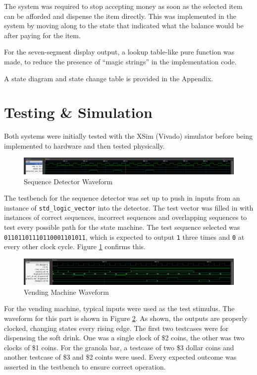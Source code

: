 \documentclass[12pt]{article}
\begin{document}
The system was required to stop accepting money as soon as the selected item can be afforded and dispense the item directly. This was implemented in the system by moving along to the state that indicated what the balance would be after paying for the item.

For the seven-segment display output, a lookup table-like pure function was made, to reduce the presence of ``magic strings'' in the implementation code.

A state diagram and state change table is provided in the Appendix.

\section{Testing \& Simulation}

Both systems were initially tested with the XSim (Vivado) simulator before being implemented to hardware and then tested physically.

\begin{figure}[h]
  \includegraphics[width=\linewidth]{waveform-sequence.png}
  \caption{Sequence Detector Waveform}
  \label{fig:waveform-sequence}
\end{figure}

The testbench for the sequence detector was set up to push in inputs from an instance of \verb|std_logic_vector| into the detector. The test vector was filled in with instances of correct sequences, incorrect sequences and overlapping sequences to test every possible path for the state machine.
The test sequence selected was \verb|01101101110110001101011|, which is expected to output \verb|1| three times and \verb|0| at every other clock cycle. Figure \ref{fig:waveform-sequence} confirms this.

\begin{figure}[h]
  \includegraphics[width=\linewidth]{waveform-vending.png}
  \caption{Vending Machine Waveform}
  \label{fig:waveform-vending}
\end{figure}

For the vending machine, typical inputs were used as the test stimulus. The waveform for this part is shown in Figure \ref{fig:waveform-vending}. As shown, the outputs are properly clocked, changing states every rising edge. The first two testcases were for dispensing the soft drink. One was a single clock of \$2 coins, the other was two clocks of \$1 coins. For the granola bar, a testcase of two \$3 dollar coins and another testcase of \$3 and \$2 coints were used. Every expected outcome was asserted in the testbench to ensure correct operation.
\end{document}
